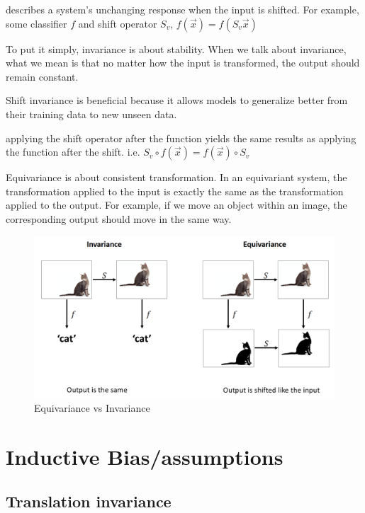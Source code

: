 \documentclass[11pt]{article}
\begin{document}
\begin{definition}\label{def:shift-invariance}
    describes a system's unchanging response when the input is shifted. For example, some classifier $f$ and shift operator $S_v$, $f(\vec{x})=f(S_v\vec{x})$
\end{definition}

To put it simply, invariance is about stability. When we talk about invariance, what we mean is that no matter how the input is transformed, the output should remain constant.

Shift invariance is beneficial because it allows models to generalize better from their training data to new unseen data.

\begin{definition}\label{def:shift-equivariance}
    applying the shift operator after the function yields the same results as applying the function after the shift. i.e. $S_v \circ f(\vec{x}) = f(\vec{x}) \circ S_v$
\end{definition}

Equivariance is about consistent transformation. In an equivariant system, the transformation applied to the input is exactly the same as the transformation applied to the output. For example, if we move an object within an image, the corresponding output should move in the same way.

\begin{figure}[H]
    \centering
    \includegraphics[width=.7\textwidth]{figures/equivariance-vs-invariance.png}
    \caption{Equivariance vs Invariance}
\end{figure}

\section{Inductive Bias/assumptions}

\subsection{Translation invariance}
\end{document}
